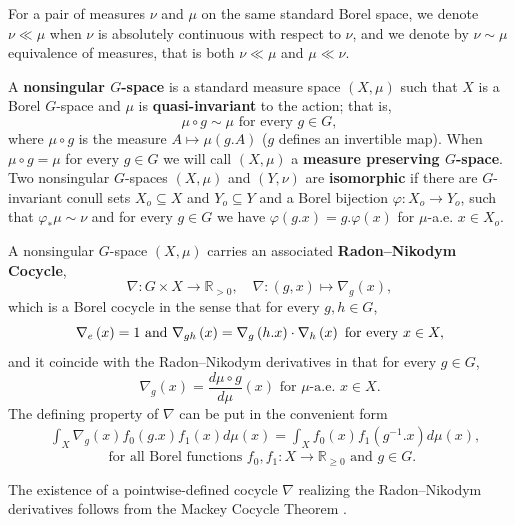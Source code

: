 \documentclass{amsart}
\numberwithin{equation}{subsection}
\begin{document}
For a pair of measures \(\nu\) and \(\mu\) on the same standard Borel space, we denote \(\nu\ll\mu\) when \(\nu\) is absolutely continuous with respect to \(\nu\), and we denote by \(\nu\sim\mu\) equivalence of measures, that is both \(\nu\ll\mu\) and \(\mu\ll\nu\).

A {\bf nonsingular \(G\)-space} is a standard measure space \(\left(X,\mu\right)\) such that \(X\) is a Borel \(G\)-space and \(\mu\) is {\bf quasi-invariant} to the action; that is,
\[\mu\circ g\sim\mu\text{ for every }g\in G,\]
where \(\mu\circ g\) is the measure \(A\mapsto\mu\left(g.A\right)\) (\(g\) defines an invertible map). When \(\mu\circ g=\mu\) for every \(g\in G\) we will call \(\left(X,\mu\right)\) a {\bf measure preserving \(G\)-space}. Two nonsingular \(G\)-spaces \(\left(X,\mu\right)\) and \(\left(Y,\nu\right)\) are {\bf isomorphic} if there are \(G\)-invariant conull sets \(X_{o}\subseteq X\) and \(Y_{o}\subseteq Y\) and a Borel bijection \(\varphi:X_{o}\to Y_{o}\), such that \(\varphi_{\ast}\mu\sim\nu\) and for every \(g\in G\) we have \(\varphi\left(g.x\right)=g.\varphi\left(x\right)\) for \(\mu\)-a.e. \(x\in X_{o}\).

A nonsingular \(G\)-space \(\left(X,\mu\right)\) carries an associated {\bf Radon--Nikodym Cocycle},
\[\nabla:G\times X\to\mathbb{R}_{>0},\quad\nabla:\left(g,x\right)\mapsto\nabla_{g}\left(x\right),\]
which is a Borel cocycle in the sense that for every \(g,h\in G\),
\[\nabla_{e}\left(x\right)=1\text{ and }\nabla_{gh}\left(x\right)=\nabla_{g}\left(h.x\right)\cdot\nabla_{h}\left(x\right)\text{ for \emph{every} }x\in X,\]
and it coincide with the Radon--Nikodym derivatives in that for every \(g\in G\),
\[\nabla_{g}\left(x\right)=\frac{d\mu\circ g}{d\mu}\left(x\right)\text{ for }\mu\text{-a.e. }x\in X.\]
The defining property of \(\nabla\) can be put in the convenient form
\begin{equation}
\label{eq:nabla}\tag{\(\dagger\)}
\begin{aligned}
&\int\nolimits_{X}\nabla_{g}\left(x\right)f_{0}\left(g.x\right)f_{1}\left(x\right)d\mu\left(x\right)=\int\nolimits_{X}f_{0}\left(x\right)f_{1}\left(g^{-1}.x\right)d\mu\left(x\right),
\end{aligned}
\end{equation}
\[\text{ for all Borel functions } f_{0},f_{1}:X\to\mathbb{R}_{\geq 0}\text{ and }g\in G.\]

The existence of a pointwise-defined cocycle \(\nabla\) realizing the Radon–Nikodym derivatives follows from the Mackey Cocycle Theorem \cite[Lemma 5.26, p. 179]{varadarajan1968geometry}.
\end{document}

